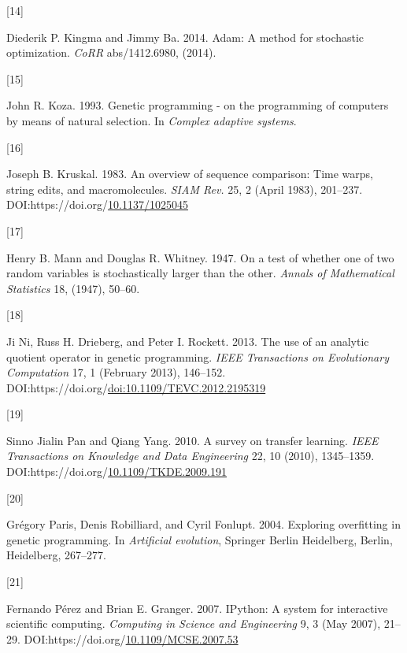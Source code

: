 \documentclass[
  11pt,
]{article}
\newlength{\cslhangindent}
\newlength{\csllabelwidth}
\newlength{\cslentryspacingunit} %
\newenvironment{CSLReferences}[2] %
 {%
  \setlength{\parindent}{0pt}
  \ifodd #1
  \let\oldpar\par
  \def\par{\hangindent=\cslhangindent\oldpar}
  \fi
  \setlength{\parskip}{#2\cslentryspacingunit}
 }%
 {}
\newcommand{\CSLLeftMargin}[1]{\parbox[t]{\csllabelwidth}{#1}}
\newcommand{\CSLRightInline}[1]{\parbox[t]{\linewidth - \csllabelwidth}{#1}\break}
\begin{document}
\begin{CSLReferences}{0}{0}
\leavevmode{}%
\CSLLeftMargin{{[}14{]} }%
\CSLRightInline{Diederik P. Kingma and Jimmy Ba. 2014. Adam: A method for stochastic optimization. \emph{CoRR} abs/1412.6980, (2014).}

\leavevmode{}%
\CSLLeftMargin{{[}15{]} }%
\CSLRightInline{John R. Koza. 1993. Genetic programming - on the programming of computers by means of natural selection. In \emph{Complex adaptive systems}.}

\leavevmode{}%
\CSLLeftMargin{{[}16{]} }%
\CSLRightInline{Joseph B. Kruskal. 1983. An overview of sequence comparison: Time warps, string edits, and macromolecules. \emph{SIAM Rev.} 25, 2 (April 1983), 201--237. DOI:https://doi.org/\href{https://doi.org/10.1137/1025045}{10.1137/1025045}}

\leavevmode{}%
\CSLLeftMargin{{[}17{]} }%
\CSLRightInline{Henry B. Mann and Douglas R. Whitney. 1947. On a test of whether one of two random variables is stochastically larger than the other. \emph{Annals of Mathematical Statistics} 18, (1947), 50--60.}

\leavevmode{}%
\CSLLeftMargin{{[}18{]} }%
\CSLRightInline{Ji Ni, Russ H. Drieberg, and Peter I. Rockett. 2013. The use of an analytic quotient operator in genetic programming. \emph{IEEE Transactions on Evolutionary Computation} 17, 1 (February 2013), 146--152. DOI:https://doi.org/\href{https://doi.org/doi:10.1109/TEVC.2012.2195319}{doi:10.1109/TEVC.2012.2195319}}

\leavevmode{}%
\CSLLeftMargin{{[}19{]} }%
\CSLRightInline{Sinno Jialin Pan and Qiang Yang. 2010. A survey on transfer learning. \emph{IEEE Transactions on Knowledge and Data Engineering} 22, 10 (2010), 1345--1359. DOI:https://doi.org/\href{https://doi.org/10.1109/TKDE.2009.191}{10.1109/TKDE.2009.191}}

\leavevmode{}%
\CSLLeftMargin{{[}20{]} }%
\CSLRightInline{Grégory Paris, Denis Robilliard, and Cyril Fonlupt. 2004. Exploring overfitting in genetic programming. In \emph{Artificial evolution}, Springer Berlin Heidelberg, Berlin, Heidelberg, 267--277.}

\leavevmode{}%
\CSLLeftMargin{{[}21{]} }%
\CSLRightInline{Fernando Pérez and Brian E. Granger. 2007. {IP}ython: A system for interactive scientific computing. \emph{Computing in Science and Engineering} 9, 3 (May 2007), 21--29. DOI:https://doi.org/\href{https://doi.org/10.1109/MCSE.2007.53}{10.1109/MCSE.2007.53}}


\end{CSLReferences}
\end{document}
